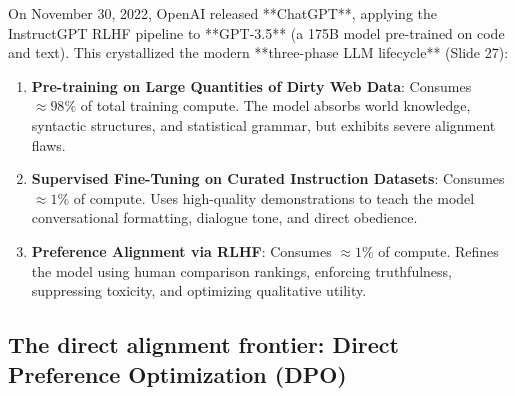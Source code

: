 \documentclass[../../main.tex]{subfiles}
\begin{document}
On November 30, 2022, OpenAI released **ChatGPT**, applying the InstructGPT RLHF pipeline to **GPT-3.5** (a 175B model pre-trained on code and text). This crystallized the modern **three-phase LLM lifecycle** (Slide 27):
\begin{enumerate}
    \item \textbf{Pre-training on Large Quantities of Dirty Web Data}: Consumes $\approx 98\%$ of total training compute. The model absorbs world knowledge, syntactic structures, and statistical grammar, but exhibits severe alignment flaws.
    \item \textbf{Supervised Fine-Tuning on Curated Instruction Datasets}: Consumes $\approx 1\%$ of compute. Uses high-quality demonstrations to teach the model conversational formatting, dialogue tone, and direct obedience.
    \item \textbf{Preference Alignment via RLHF}: Consumes $\approx 1\%$ of compute. Refines the model using human comparison rankings, enforcing truthfulness, suppressing toxicity, and optimizing qualitative utility.
\end{enumerate}

\subsection{The direct alignment frontier: Direct Preference Optimization (DPO)}
\label{subsec:dpo_direct_alignment_frontier}
\end{document}

